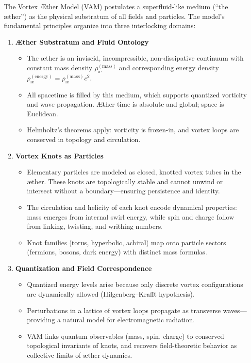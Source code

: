 \documentclass[11pt]{article}
\begin{document}
\begin{tcolorbox}[axiomstyle]
    The Vortex Æther Model (VAM) postulates a superfluid-like medium (“the æther”) as the physical substratum of all fields and particles. The model’s fundamental principles organize into three interlocking domains:

    \begin{enumerate}[label=\textbf{A\arabic*.}, leftmargin=*]
        \item \textbf{Æther Substratum and Fluid Ontology}
        \begin{itemize}
            \item The æther is an inviscid, incompressible, non-dissipative continuum with constant mass density $\rho_{\text{\ae}}^{(\mathrm{mass})}$ and corresponding energy density $\rho_{\text{\ae}}^{(\mathrm{energy})} = \rho_{\text{\ae}}^{(\mathrm{mass})} c^2$.
            \item All spacetime is filled by this medium, which supports quantized vorticity and wave propagation. Æther time is absolute and global; space is Euclidean.
            \item Helmholtz’s theorems apply: vorticity is frozen-in, and vortex loops are conserved in topology and circulation.
        \end{itemize}

        \item \textbf{Vortex Knots as Particles}
        \begin{itemize}
            \item Elementary particles are modeled as closed, knotted vortex tubes in the æther. These knots are topologically stable and cannot unwind or intersect without a boundary—ensuring persistence and identity.
            \item The circulation and helicity of each knot encode dynamical properties: mass emerges from internal swirl energy, while spin and charge follow from linking, twisting, and writhing numbers.
            \item Knot families (torus, hyperbolic, achiral) map onto particle sectors (fermions, bosons, dark energy) with distinct mass formulas.
        \end{itemize}

        \item \textbf{Quantization and Field Correspondence}
        \begin{itemize}
            \item Quantized energy levels arise because only discrete vortex configurations are dynamically allowed (Hilgenberg–Krafft hypothesis).
            \item Perturbations in a lattice of vortex loops propagate as transverse waves—providing a natural model for electromagnetic radiation.
            \item VAM links quantum observables (mass, spin, charge) to conserved topological invariants of knots, and recovers field-theoretic behavior as collective limits of æther dynamics.
        \end{itemize}
    \end{enumerate}
\end{tcolorbox}
\end{document}
